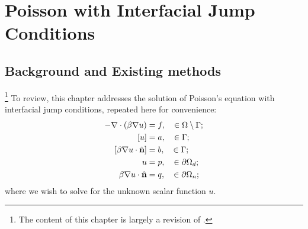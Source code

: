 %

\chapter{Poisson with Interfacial Jump Conditions} \label{ch:pt2.poisson}

\section{Background and Existing methods} \label{sec:ch4.background}

\footnote{The content of this chapter is largely a revision of \cite{Hellrung12}.}
To review, this chapter addresses the solution of Poisson's equation with interfacial jump conditions, repeated here for convenience:
\begin{subequations} \label{eq:ch4.poisson}
\begin{align}
-\nabla \cdot \left( \beta \nabla u \right) & = f, \quad \in \Omega \setminus \Gamma; \label{eq:ch4.poisson.PDE} \\
\left[ u \right] & = a, \quad \in \Gamma; \label{eq:ch4.poisson.DJ} \\
\left[ \beta \nabla u \cdot \hat{\mathbf{n}} \right] & = b, \quad \in \Gamma; \label{eq:ch4.poisson.NJ} \\
u & = p, \quad \in \partial\Omega_d; \label{eq:ch4.poisson.D} \\
\beta \nabla u \cdot \hat{\mathbf{n}} & = q, \quad \in \partial\Omega_n; \label{eq:ch4.poisson.N}
\end{align}
\end{subequations}
where we wish to solve for the unknown scalar function $u$.


